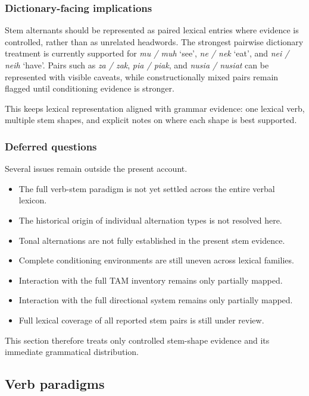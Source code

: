 \documentclass[
  11pt,
  a4paper,
]{article}
\providecommand{\tightlist}{%
  \setlength{\itemsep}{0pt}\setlength{\parskip}{0pt}}
\newcommand{\tdim}[1]{\textit{#1}}
\newcommand{\glossquote}[1]{`#1'}
\begin{document}
\subsubsection{Dictionary-facing
implications}\label{dictionary-facing-implications}

Stem alternants should be represented as paired lexical entries where
evidence is controlled, rather than as unrelated headwords. The
strongest pairwise dictionary treatment is currently supported for
\tdim{mu / muh} \glossquote{see}, \tdim{ne / nek} \glossquote{eat}, and
\tdim{nei / neih} \glossquote{have}. Pairs such as \tdim{za / zak},
\tdim{pia / piak}, and \tdim{nusia / nusiat} can be represented with
visible caveats, while constructionally mixed pairs remain flagged until
conditioning evidence is stronger.

This keeps lexical representation aligned with grammar evidence: one
lexical verb, multiple stem shapes, and explicit notes on where each
shape is best supported.

\subsubsection{Deferred questions}\label{deferred-questions-1}

Several issues remain outside the present account.

\begin{itemize}
\tightlist
\item
  The full verb-stem paradigm is not yet settled across the entire
  verbal lexicon.
\item
  The historical origin of individual alternation types is not resolved
  here.
\item
  Tonal alternations are not fully established in the present stem
  evidence.
\item
  Complete conditioning environments are still uneven across lexical
  families.
\item
  Interaction with the full TAM inventory remains only partially mapped.
\item
  Interaction with the full directional system remains only partially
  mapped.
\item
  Full lexical coverage of all reported stem pairs is still under
  review.
\end{itemize}

This section therefore treats only controlled stem-shape evidence and
its immediate grammatical distribution.

\subsection{Verb paradigms}\label{verb-paradigms}
\end{document}
